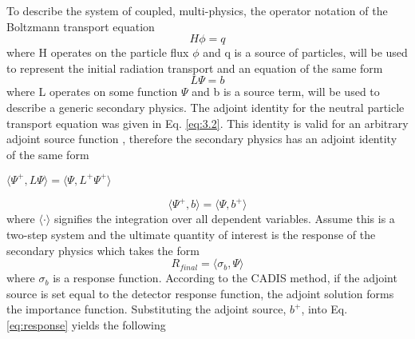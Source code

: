 To describe the system of coupled, multi-physics,
the operator notation of the Boltzmann transport equation
\begin{equation}
	H\phi = q
\end{equation}
where H operates on the particle flux $\phi$ and q is a source of particles, 
will be used to represent the initial radiation transport and 
an equation of the same form 
\begin{equation}
	L\Psi = b
\end{equation}
where L operates on some function $\Psi$ and b is a source term, will be used
to describe a generic secondary physics. 
The adjoint identity for the neutral particle transport
equation was given in Eq. \ref{eq:3.2}.
This identity is valid for an arbitrary adjoint source function
\cite{l_m}, therefore the secondary physics has an adjoint identity of the same
form
\begin{center}
{$\langle \Psi^{+}, L\Psi \rangle = \langle \Psi, L^{+}\Psi^{+} \rangle $}
\end{center}
\begin{equation}\label{eq:adj_2_identity}
	\langle \Psi^{+}, b \rangle =
	\langle \Psi, b^{+} \rangle 
\end{equation}
where $\langle \cdot \rangle$ signifies the integration over all dependent variables.
Assume this is a two-step system and the ultimate quantity of interest is the 
response of the secondary physics which takes the form
\begin{equation}\label{eq:response}
	R_{final} = \langle \sigma_b , \Psi \rangle
\end{equation}
where $\sigma_b$ is a response function.
According to the CADIS method, 
if the adjoint source is set equal to the detector response
function, the adjoint solution forms the importance function. 
Substituting the adjoint source, $b^{+}$, into Eq. \ref{eq:response} yields the following
